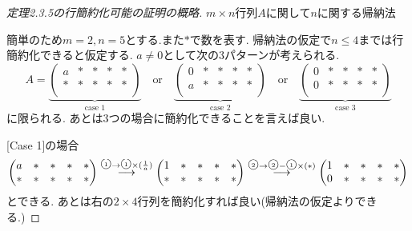 \documentclass[dvipdfmx,a4paper,11pt]{article} %
\newcommand{\maru}[1]{\raise0.2ex\hbox{\textcircled{\tiny{#1}}}}
\theoremstyle{definition}
\begin{document}
\begin{proof}[定理2.3.5の行簡約化可能の証明の概略]
$m \times n$行列$A$に関して$n$に関する帰納法

簡単のため$m=2, n=5$とする.また$\ast$で数を表す.
帰納法の仮定で$n \le 4$までは行簡約化できると仮定する.
$a \neq 0$として次の3パターンが考えられる. 
$$
A=
 \underbrace{\begin{pmatrix}
 a&  \ast&  \ast &  \ast& \ast\\
 \ast &  \ast&  \ast  &  \ast& \ast\\
 \end{pmatrix}}_{\text{case 1}}
 \quad\text{or}\quad 
 \underbrace{\begin{pmatrix}
 0&  \ast&  \ast &  \ast& \ast\\
 a &  \ast&  \ast  &  \ast& \ast\\
 \end{pmatrix}
 }_{\text{case 2}}
 \quad\text{or}\quad 
 \underbrace{\begin{pmatrix}
 0&  \ast&  \ast &  \ast& \ast\\
 0&  \ast&  \ast  &  \ast& \ast\\
 \end{pmatrix}
  }_{\text{case 3}} 
$$
に限られる. 
あとは3つの場合に簡約化できることを言えば良い. 

[Case 1]の場合
$$
\begin{pmatrix}
 a&  \ast&  \ast &  \ast& \ast\\
 \ast &  \ast&  \ast  &  \ast& \ast\\
 \end{pmatrix}
 \overset{\maru{1} \to \maru{1}\times(\frac{1}{a})}{\longrightarrow}  
 \begin{pmatrix}
 1&  \ast&  \ast &  \ast& \ast\\
 \ast &  \ast&  \ast  &  \ast& \ast\\
 \end{pmatrix}
  \overset{\maru{2} \to \maru{2} - \maru{1}\times(\ast)}{\longrightarrow}  
   \begin{pmatrix}
 1&  \ast&  \ast &  \ast& \ast\\
0 &  \ast&  \ast  &  \ast& \ast\\
 \end{pmatrix}
$$
とできる. 
あとは右の$2 \times 4$行列を簡約化すれば良い(帰納法の仮定よりできる.)



\end{proof}
\end{document}
